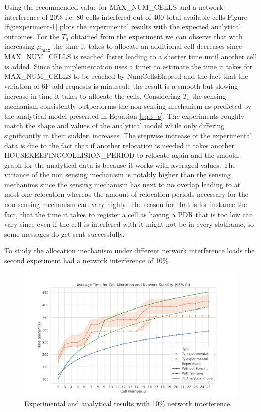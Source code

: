 \documentclass{comnets-thesis}
\begin{document}
Using the recommended value for MAX\_NUM\_CELLS and a network interference of 20\% i.e. 80 cells interfered out of 400 total available cells Figure \ref{fig:experiment-1} plots the experimental results with the expected analytical outcomes.
For the $T_a$ obtained from the experiment we can observe that with increasing $\mu_{\max}$ the time it takes to allocate an additional cell decreases since MAX\_NUM\_CELLS is reached faster leading to a shorter time until another cell is added. Since the implementation uses a timer to estimate the time it takes for MAX\_NUM\_CELLS to be reached by NumCellsElapsed and the fact that the variation of \ac{6P} add requests is minuscule the result is a smooth but slowing increase in time it takes to allocate the cells.
Considering $T_s$ the sensing mechanism consistently outperforms the non sensing mechanism as predicted by the analytical model presented in Equation \ref{eq:t_s}. The experiments roughly match the shape and values of the analytical model while only differing significantly in their sudden increases. The stepwise increase of the experimental data is due to the fact that if another relocation is needed it takes another HOUSEKEEPINGCOLLISION\_PERIOD to relocate again and the smooth graph for the analytical data is because it works with averaged values.
The variance of the non sensing mechanism is notably higher than the sensing mechanims since the sensing mechanism has next to no overlap leading to at most one relocation whereas the amount of relocation periods necessary for the non sensing mechanism can vary highly. The reason for that is for instance the fact, that the time it takes to register a cell as having a \ac{PDR} that is too low can vary since even if the cell is interfered with it might not be in every slotframe, so some messages do get sent successfully.

To study the allocation mechanism under different network interference loads the second experiment had a network interference of 10\%.

\begin{figure}[H]
    \centering
    \includegraphics[width=1\textwidth]{./images/experiment2.png}
    \caption{Experimental and analytical results with 10\% network interference.}
    \label{fig:experiment-2}
\end{figure}
\end{document}
